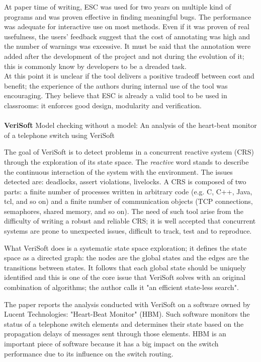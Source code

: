 At paper time of writing, ESC was used for two years on multiple kind of programs and was proven effective in finding meaningful bugs. The performance was adequate for interactive use on most methods. 
Even if it was proven of real usefulness, the users' feedback suggest that the cost of annotating was high and the number of warnings was excessive.
It must be said that the annotation were added after the development of the project and not during the evolution of it; this is commonly know by developers to be a dreaded task. 
\\
At this point it is unclear if the tool delivers a positive tradeoff between cost and benefit; the experience of the authors during internal use of the tool was encouraging. They believe that ESC is already a valid tool to be used in classrooms: it enforces good design, modularity and verification.
\\
\\
\textbf{VeriSoft} \cite{godefroid1998model} Model checking without a model: An analysis of the heart-beat monitor of a telephone switch using VeriSoft

The goal of VeriSoft is to detect problems in a concurrent reactive system (CRS) through the exploration of its state space. The \emph{reactive} word stands to describe the continuous interaction of the system with the environment.
The issues detected are: deadlocks, assert violations, livelocks. 
A CRS is composed of two parts: a finite number of processes written in arbitrary code (e.g. C, C++, Java, tcl, and so on) and a finite number of communication objects (TCP connections, semaphores, shared memory, and so on).
The need of such tool arise from the difficulty of writing a robust and reliable CRS; it is well accepted that concurrent systems are prone to unexpected issues, difficult to track, test and to reproduce.

What VeriSoft does is a systematic state space exploration; it defines the state space as a directed graph: the nodes are the global states and the edges are the transitions between states. 
It follows that each global state should be uniquely identified and this is one of the core issue that VeriSoft solves with an original combination of algorithms; the author calls it "an efficient state-less search".

The paper reports the analysis conducted with VeriSoft on a software owned by Lucent Technologies: "Heart-Beat Monitor" (HBM). Such software monitors the status of a telephone switch elements and determines their state based on the propagation delays of messages sent through those elements.
HBM is an important piece of software because it has a big impact on the switch performance due to its influence on the switch routing.


